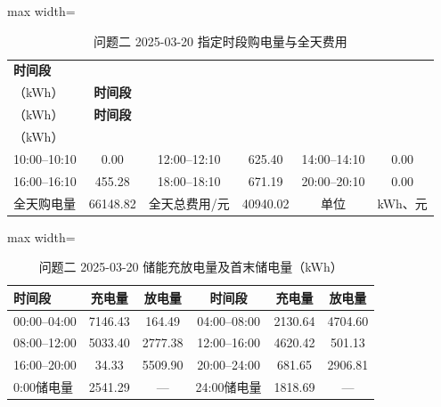 \documentclass[UTF8,a4paper,zihao=-4,fontset=windows]{ctexart}
\begin{document}
\begin{table}[H]\centering
\fontsize{9.5}{12}\selectfont\setlength{\tabcolsep}{4pt}\renewcommand{\arraystretch}{1.12}
\begin{adjustbox}{max width=\linewidth}\begin{tabular}{lccccc}\toprule
\textbf{时间段} & \shortstack{\textbf{购电量}\\{\normalfont （kWh）}} & \textbf{时间段} & \shortstack{\textbf{购电量}\\{\normalfont （kWh）}} & \textbf{时间段} & \shortstack{\textbf{购电量}\\{\normalfont （kWh）}}\\\midrule
10:00–10:10 & 0.00 & 12:00–12:10 & 625.40 & 14:00–14:10 & 0.00\\
16:00–16:10 & 455.28 & 18:00–18:10 & 671.19 & 20:00–20:10 & 0.00\\
全天购电量 & 66148.82 & 全天总费用/元 & 40940.02 & 单位 & kWh、元\\
\bottomrule\end{tabular}\end{adjustbox}
\caption{问题二 2025-03-20 指定时段购电量与全天费用}
\end{table}
\begin{table}[H]\centering
\fontsize{9.5}{12}\selectfont\setlength{\tabcolsep}{4pt}\renewcommand{\arraystretch}{1.12}
\begin{adjustbox}{max width=\linewidth}\begin{tabular}{lccccc}\toprule
\textbf{时间段} & \textbf{充电量} & \textbf{放电量} & \textbf{时间段} & \textbf{充电量} & \textbf{放电量}\\\midrule
00:00–04:00 & 7146.43 & 164.49 & 04:00–08:00 & 2130.64 & 4704.60\\
08:00–12:00 & 5033.40 & 2777.38 & 12:00–16:00 & 4620.42 & 501.13\\
16:00–20:00 & 34.33 & 5509.90 & 20:00–24:00 & 681.65 & 2906.81\\
0:00储电量 & 2541.29 & — & 24:00储电量 & 1818.69 & —\\
\bottomrule\end{tabular}\end{adjustbox}
\caption{问题二 2025-03-20 储能充放电量及首末储电量（kWh）}
\end{table}
\end{document}
